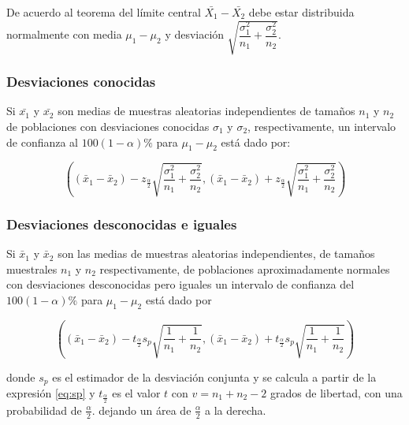 \documentclass[letterpaper,]{book}
\begin{document}
De acuerdo al teorema del límite central \(\bar{X_1}-\bar{X_2}\) debe estar distribuida normalmente con media \(\mu_1 - \mu_2\) y desviación \(\sqrt{\dfrac{\sigma_1^2}{n_1} + \dfrac{\sigma_2^2}{n_2}}\).

\hypertarget{desviaciones-conocidas}{%
\subsubsection{Desviaciones conocidas}\label{desviaciones-conocidas}}

Si \(\bar{x_1}\) y \(\bar{x_2}\) son medias de muestras aleatorias independientes de tamaños \(n_1\) y \(n_2\) de poblaciones con desviaciones conocidas \(\sigma_1\) y \(\sigma_2\), respectivamente, un intervalo de confianza al \(100\left(1-\alpha\right)\%\) para \(\mu_1-\mu_2\) está dado por:

\begin{equation} 
\left( \left( \bar{x}_1 - \bar{x}_2 \right) - z_{\frac{\alpha}{2}}\sqrt{\dfrac{\sigma_1^2}{n_1} + \dfrac{\sigma_2^2}{n_2}} , \left( \bar{x}_1 - \bar{x}_2 \right) + z_{\frac{\alpha}{2}}\sqrt{\dfrac{\sigma_1^2}{n_1} + \dfrac{\sigma_2^2}{n_2}} \right) 
\label{eq:ic2msc}
\end{equation}

\hypertarget{desviaciones-desconocidas-e-iguales}{%
\subsubsection{Desviaciones desconocidas e iguales}\label{desviaciones-desconocidas-e-iguales}}

Si \(\bar{x}_1\) y \(\bar{x}_2\) son las medias de muestras aleatorias independientes, de tamaños muestrales \(n_1\) y \(n_2\) respectivamente, de poblaciones aproximadamente normales con desviaciones desconocidas pero iguales un intervalo de confianza del \(100\left(1-\alpha \right)\%\) para \(\mu_1 - \mu_2\) está dado por

\begin{equation} 
\left( \left( \bar{x}_1 - \bar{x}_2 \right) - t_{\frac{\alpha}{2}}s_p\sqrt{\dfrac{1}{n_1} + \dfrac{1}{n_2}} , \left( \bar{x}_1 - \bar{x}_2 \right) + t_{\frac{\alpha}{2}}s_p\sqrt{\dfrac{1}{n_1} + \dfrac{1}{n_2}} \right) 
\label{eq:ic2msd}
\end{equation}

donde \(s_p\) es el estimador de la desviación conjunta y se calcula a partir de la expresión \eqref{eq:sp} y \(t_{\frac{\alpha}{2}}\) es el valor \(t\) con \(v=n_1+n_2-2\) grados de libertad, con una probabilidad de \(\frac{\alpha}{2}\). dejando un área de \(\frac{\alpha}{2}\) a la derecha.
\end{document}
